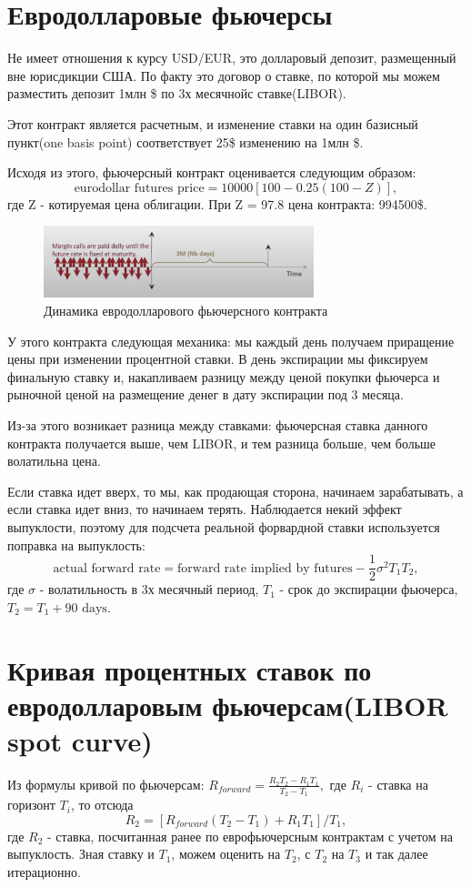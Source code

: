 \documentclass{article}
\begin{document}
\section{Евродолларовые фьючерсы}
Не имеет отношения к курсу USD/EUR, это долларовый депозит, размещенный вне юрисдикции США.
По факту это договор о ставке, по которой мы можем разместить депозит 1млн \$ по 3х месячнойс ставке(LIBOR).

Этот контракт является расчетным, и изменение ставки на один базисный пункт(one basis point) соответствует 25\$ изменению на 1млн \$.

Исходя из этого, фьючерсный контракт оценивается следующим образом:
$$\text{eurodollar futures price} = 10000[100 - 0.25(100 - Z)],$$
где Z - котируемая цена облигации.
При Z = 97.8 цена контракта: 994500\$.


\begin{figure}[h]
\centering
\includegraphics[width=0.7\textwidth]{eurusd.png}
\caption{Динамика евродолларового фьючерсного контракта}
\label{loadings}
\end{figure}

У этого контракта следующая механика: мы каждый день получаем приращение цены при изменении процентной ставки. В день экспирации мы фиксируем финальную ставку и, накапливаем  разницу между ценой покупки фьючерса и рыночной ценой на размещение денег в дату экспирации под 3 месяца.

Из-за этого возникает разница между ставками: фьючерсная ставка данного контракта получается выше, чем LIBOR, и тем разница больше, чем больше волатильна цена.

Если ставка идет вверх, то мы, как продающая сторона, начинаем зарабатывать, а если ставка идет вниз, то начинаем терять. Наблюдается некий эффект выпуклости, поэтому для подсчета реальной форвардной ставки используется поправка на выпуклость:
$$\text{actual forward rate} = \text{forward rate implied by futures} - \frac{1}{2} \sigma^{2}T_{1}T_{2},$$
где $\sigma$ - волатильность в 3х месячный период, $T_1$ - срок до экспирации фьючерса, $T_2 = T_1 + 90 \text{ days}$.

\section{Кривая процентных ставок по евродолларовым фьючерсам(LIBOR spot curve)}
Из формулы кривой по фьючерсам:
$R_{forward} = \frac{R_2 T_2 - R_1 T_1}{T_2 - T_1},$ где $R_i$ - ставка на горизонт $T_i$, то отсюда 
$$R_2 = [R_{forward}(T_2 - T_1) + R_1 T_1]/T_1,$$ где $R_2$ - ставка, посчитанная ранее по еврофьючерсным контрактам с учетом на выпуклость. Зная ставку и $T_1$, можем оценить на $T_2$, с $T_2$ на $T_3$ и так далее итерационно. 
\end{document}
